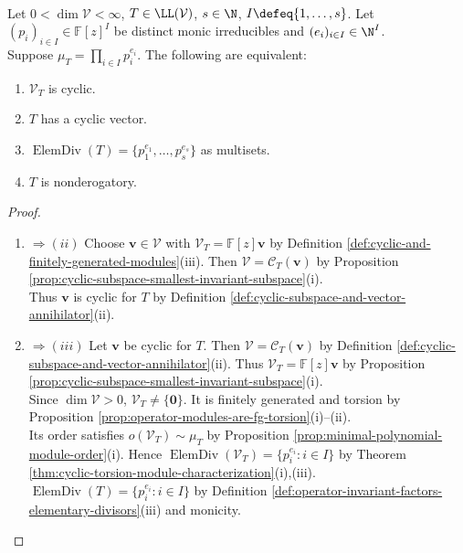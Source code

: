 \begin{theorem} \label{thm:nonderogatory-cyclic-equivalences} \\
Let $0<\dim\mathcal{V}<\infty$, $T\in\LL(\mathcal{V})$, $s\in\N$, $I\defeq\{1,\ldots,s\}$. Let $(p_i)_{i\in I}\in\mathbb{F}[z]^I$ be distinct monic irreducibles and $(e_i)_{i\in I}\in\N^I$.\\
Suppose $\mu_T=\prod\limits_{i\in I}p_i^{e_i}$. The following are equivalent:
\begin{enumerate}[label=(\roman*)]
\setlength{\itemsep}{0pt}
\item $\mathcal{V}_T$ is cyclic.
\item $T$ has a cyclic vector.
\item $\operatorname{ElemDiv}(T)=\{p_1^{e_1},\ldots,p_s^{e_s}\}$ as multisets.
\item $T$ is nonderogatory.
\end{enumerate}
\begin{proof}
\begin{enumerate}[label=(\roman*)]
\setlength{\itemsep}{0pt}
\item[$(i)$]$\Rightarrow (ii)$ Choose $\mathbf{v}\in\mathcal{V}$ with $\mathcal{V}_T=\mathbb{F}[z]\mathbf{v}$ by Definition \ref{def:cyclic-and-finitely-generated-modules}(iii). Then $\mathcal{V}=\mathcal{C}_T(\mathbf{v})$ by Proposition \ref{prop:cyclic-subspace-smallest-invariant-subspace}(i).\\
Thus $\mathbf{v}$ is cyclic for $T$ by Definition \ref{def:cyclic-subspace-and-vector-annihilator}(ii).
\item[$(ii)$]$\Rightarrow (iii)$ Let $\mathbf{v}$ be cyclic for $T$. Then $\mathcal{V}=\mathcal{C}_T(\mathbf{v})$ by Definition \ref{def:cyclic-subspace-and-vector-annihilator}(ii). Thus $\mathcal{V}_T=\mathbb{F}[z]\mathbf{v}$ by Proposition \ref{prop:cyclic-subspace-smallest-invariant-subspace}(i).\\
Since $\dim\mathcal{V}>0$, $\mathcal{V}_T\neq\{\mathbf{0}\}$. It is finitely generated and torsion by Proposition \ref{prop:operator-modules-are-fg-torsion}(i)--(ii).\\
Its order satisfies $o(\mathcal{V}_T)\sim\mu_T$ by Proposition \ref{prop:minimal-polynomial-module-order}(i). Hence $\operatorname{ElemDiv}(\mathcal{V}_T)=\{p_i^{e_i}:i\in I\}$ by Theorem \ref{thm:cyclic-torsion-module-characterization}(i),(iii).\\
$\operatorname{ElemDiv}(T)=\{p_i^{e_i}:i\in I\}$ by Definition \ref{def:operator-invariant-factors-elementary-divisors}(iii) and monicity.

\end{enumerate}
\end{proof}
\end{theorem}
